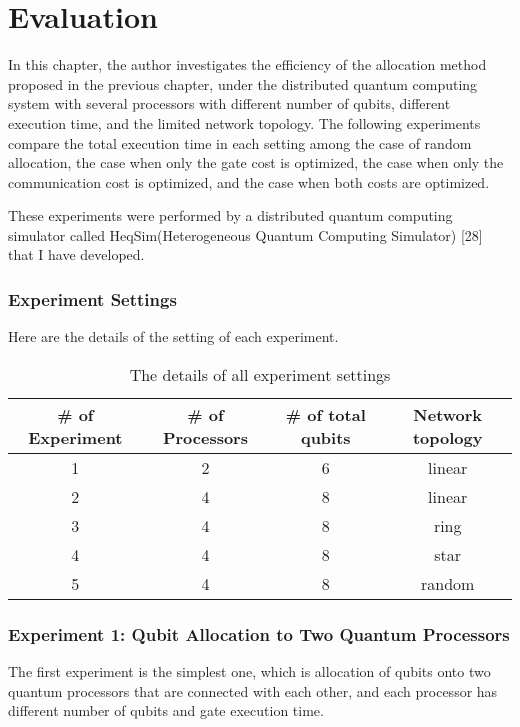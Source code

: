 \chapter{Evaluation}

 In this chapter, the author investigates the efficiency of the allocation method proposed in the previous chapter, under the distributed quantum computing system with several processors with different number of qubits, different execution time, and the limited network topology.  The following experiments compare the total execution time in each setting among the case of random allocation, the case when only the gate cost is optimized, the case when only the communication cost is optimized, and the case when both costs are optimized.
  
  These experiments were performed by a distributed quantum computing simulator called HeqSim(Heterogeneous Quantum Computing Simulator) [28] that I have developed.
  
\subsection{Experiment Settings}
 
 Here are the details of the setting of each experiment.
 
\begin{table}[htb]
\centering
  \caption{The details of all experiment settings}
 \begin{tabular}{|c|c|c|c|} \hline
 	\# of Experiment & \# of Processors & \# of total qubits & Network topology \\ \hline
	1 & 2 & 6 & linear \\ \hline
	2 & 4 & 8 & linear \\ \hline
	3 & 4 & 8 & ring \\ \hline
	4 & 4 & 8 & star \\ \hline
	5 & 4 & 8 & random \\ \hline
 \end{tabular}
 \end{table}
 
 \newpage
 
 \subsection{Experiment 1: Qubit Allocation to Two Quantum Processors}
 
 The first experiment is the simplest one, which is allocation of qubits onto two quantum processors that are connected with each other,  and each processor has different number of qubits and gate execution time.
 
